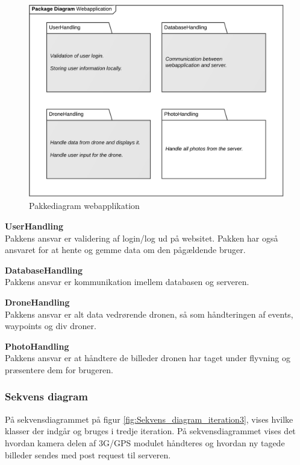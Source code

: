 \begin{figure}[H]
	\centering
	\includegraphics[width=1\textwidth]{Billeder/pakke_diagrammer/iteration3_server.png}
	\vspace{-0.5cm}
	\caption{Pakkediagram webapplikation}
	\label{fig:iteration3_pakke_diagram_webapplikation}
\end{figure}

\textbf{UserHandling}\\
Pakkens ansvar er validering af login/log ud på websitet. Pakken har også ansvaret for at hente og gemme data om den pågældende bruger.

\textbf{DatabaseHandling}\\
Pakkens ansvar er kommunikation imellem databasen og serveren. 

\textbf{DroneHandling}\\
Pakkens ansvar er alt data vedrørende dronen, så som håndteringen af events, waypoints og div droner.

\textbf{PhotoHandling}\\
Pakkens ansvar er at håndtere de billeder dronen har taget under flyvning og præsentere dem for brugeren.

\newpage

\subsubsection*{Sekvens diagram}
\vspace{-0.3cm}
På sekvensdiagrammet på figur \ref{fig:Sekvens_diagram_iteration3}, vises hvilke klasser der indgår og bruges i tredje iteration. På sekvensdiagrammet vises det hvordan kamera delen af 3G/GPS modulet håndteres og hvordan ny tagede billeder sendes med post request til serveren. 

